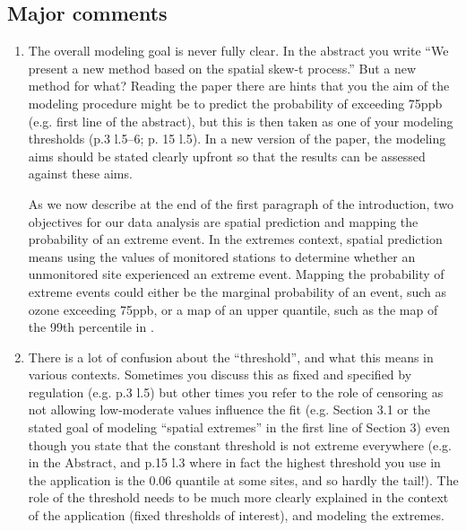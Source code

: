 \documentclass[11pt]{article}
\begin{document}
\subsection*{Major comments}
\begin{enumerate}[1.]
  \item The overall modeling goal is never fully clear. In the abstract you write ``We present a new method based on the spatial skew-t process.'' But a new method for what? Reading the paper there are hints that you the aim of the modeling procedure might be to predict the probability of exceeding 75ppb (e.g. first line of the abstract), but this is then taken as one of your modeling thresholds (p.3 l.5--6; p. 15 l.5). In a new version of the paper, the modeling aims should be stated clearly upfront so that the results can be assessed against these aims. \\

  \begin{response}
    As we now describe at the end of the first paragraph of the introduction, two objectives for our data analysis are spatial prediction and mapping the probability of an extreme event.
    In the extremes context, spatial prediction means using the values of monitored stations to determine whether an unmonitored site experienced an extreme event.
    Mapping the probability of extreme events could either be the marginal probability of an event, such as ozone exceeding 75ppb, or a map of an upper quantile, such as the map of the 99th percentile in .
  \end{response}

  \item There is a lot of confusion about the ``threshold'', and what this means in various contexts. Sometimes you discuss this as fixed and specified by regulation (e.g. p.3 l.5) but other times you refer to the role of censoring as not allowing low-moderate values influence the fit (e.g. Section 3.1 or the stated goal of modeling ``spatial extremes'' in the first line of Section 3) even though you state that the constant threshold is not extreme everywhere (e.g. in the Abstract, and p.15 l.3 where in fact the highest threshold you use in the application is the 0.06 quantile at some sites, and so hardly the tail!). The role of the threshold needs to be much more clearly explained in the context of the application (fixed thresholds of interest), and modeling the extremes. \\


\end{enumerate}
\end{document}
